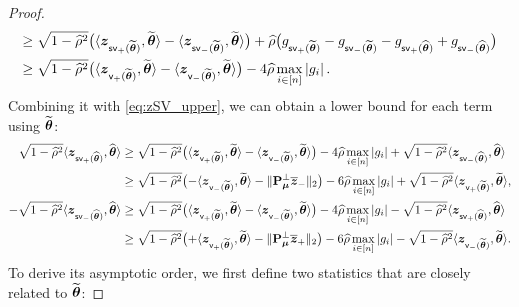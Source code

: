\begin{proof}
\begin{align*}
        \ge {} & \sqrt{1 - \hat\rho^2}  \bigl( \< \zz_{\mathsf{sv}_+(\wt\vtheta)}, \wt\vtheta \>  -  \< \zz_{\mathsf{sv}_-(\wt\vtheta)}, \wt\vtheta \>  \bigr) + \hat\rho\bigl( g_{\mathsf{sv}_+(\wt\vtheta)} - g_{\mathsf{sv}_-(\wt\vtheta)} -  g_{\mathsf{sv}_+(\hat\vtheta)} + g_{\mathsf{sv}_-(\hat\vtheta)} \bigr) \\
        \ge {} & \sqrt{1 - \hat\rho^2}   \bigl( \< \zz_{\mathsf{v}_+(\wt\vtheta)}, \wt\vtheta \>  -  \< \zz_{\mathsf{v}_-(\wt\vtheta)}, \wt\vtheta \>  \bigr) 
        - 4 \hat\rho \max_{i \in [n]} \abs{g_i}.
\end{align*}
Combining it with \cref{eq:zSV_upper}, we can obtain a lower bound for each term using $\wt\vtheta$:
\begin{equation}\label{eq:zSV_lower}
    \begin{aligned}
        \phantom{-} \sqrt{1 - \hat\rho^2} \< \zz_{\mathsf{sv}_+(\hat\vtheta)}, \hat\vtheta \>
        & \ge \sqrt{1 - \hat\rho^2}   \bigl( \< \zz_{\mathsf{v}_+(\wt\vtheta)}, \wt\vtheta \>  -  \< \zz_{\mathsf{v}_-(\wt\vtheta)}, \wt\vtheta \>  \bigr) 
        - 4 \hat\rho \max_{i \in [n]} \abs{g_i}
        + \sqrt{1 - \hat\rho^2} \< \zz_{\mathsf{sv}_-(\hat\vtheta)}, \hat\vtheta \> \\
        & \ge \sqrt{1 - \hat\rho^2} \bigl( 
        - \< \zz_{\mathsf{v}_-(\wt\vtheta)}, \wt\vtheta \> - \| \bP_{\vmu}^\perp \bar\zz_- \|_2 \bigr)
        - 6 \hat\rho \max_{i \in [n]} \abs{g_i}
        + \sqrt{1 - \hat\rho^2} \< \zz_{\mathsf{v}_+(\wt\vtheta)}, \wt\vtheta \>, 
        \\
        - \sqrt{1 - \hat\rho^2} \< \zz_{\mathsf{sv}_-(\hat\vtheta)}, \hat\vtheta \>
        & \ge \sqrt{1 - \hat\rho^2}   \bigl( \< \zz_{\mathsf{v}_+(\wt\vtheta)}, \wt\vtheta \>  -  \< \zz_{\mathsf{v}_-(\wt\vtheta)}, \wt\vtheta \>  \bigr) 
        - 4 \hat\rho \max_{i \in [n]} \abs{g_i}
        - \sqrt{1 - \hat\rho^2} \< \zz_{\mathsf{sv}_+(\hat\vtheta)}, \hat\vtheta \> \\
        & \ge \sqrt{1 - \hat\rho^2} \bigl( + \< \zz_{\mathsf{v}_+(\wt\vtheta)}, \wt\vtheta \>
        - \| \bP_{\vmu}^\perp \bar\zz_+ \|_2  \bigr)
        - 6 \hat\rho \max_{i \in [n]} \abs{g_i}
        - \sqrt{1 - \hat\rho^2} \< \zz_{\mathsf{v}_-(\wt\vtheta)}, \wt\vtheta \>.
    \end{aligned}
\end{equation}
To derive its asymptotic order, we first define two statistics that are closely related to $\wt\vtheta$: 

\end{proof}
